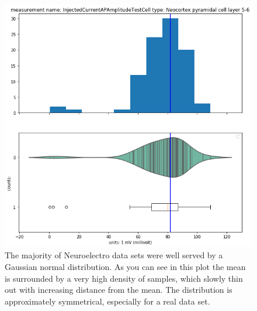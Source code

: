 \begin{figure} 
    \begin{center}
   \includegraphics[scale=0.8]{figures/mean_well_served.png}
   \caption[AP Threshold Data Distribution, Layer 5 Pyramidal Cell]{The majority of Neuroelectro data sets were well served by a Gaussian normal distribution. As you can see in this plot the mean is surrounded by a very high density of samples, which slowly thin out with increasing distance from the mean. The distribution is approximately symmetrical, especially for a real data set.}
   \label{fig:normal-feature}
    \end{center}
\end{figure}   

